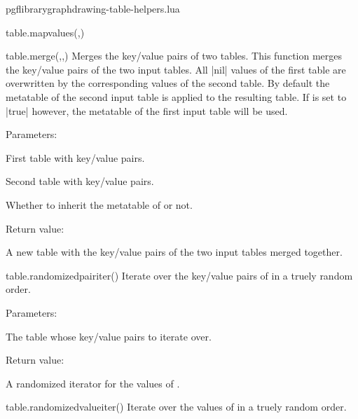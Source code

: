 \begin{filedescription}{pgflibrarygraphdrawing-table-helpers.lua}
\begin{luacommand}{{table.map\textunderscore{}values}(,)}
\end{luacommand}
\begin{luacommand}{{table.merge}(,,)}
Merges the key/value pairs of two tables.  This function merges the key/value pairs of the two input tables.  All |nil| values of the first table are overwritten by the corresponding values of the second table.  By default the metatable of the second input table is applied to the resulting table. If  is set to |true| however, the metatable of the first input table will be used. 

Parameters:
\begin{parameterdescription}
	\item[\meta{table1}] First table with key/value pairs.\item[\meta{table2}] Second table with key/value pairs.\item[\meta{first\_metatable}] Whether to inherit the metatable of  or not. 
\end{parameterdescription}


Return value:
\begin{parameterdescription} 
  \item[] A new table with the key/value pairs of the two input tables merged together. 
\end{parameterdescription}


\end{luacommand}
\begin{luacommand}{{table.randomized\textunderscore{}pair\textunderscore{}iter}()}
Iterate over the key/value pairs of  in a truely random order. 

Parameters:
\begin{parameterdescription}
	\item[\meta{table}] The table whose key/value pairs to iterate over. 
\end{parameterdescription}


Return value:
\begin{parameterdescription} 
  \item[] A randomized iterator for the values of . 
\end{parameterdescription}


\end{luacommand}
\begin{luacommand}{{table.randomized\textunderscore{}value\textunderscore{}iter}()}
Iterate over the values of  in a truely random order. 


\end{luacommand}
\end{filedescription}
